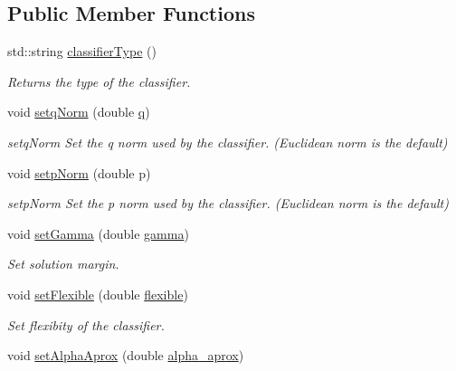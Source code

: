 \subsection*{Public Member Functions}
\begin{DoxyCompactItemize}
\item 
std\+::string \hyperlink{class_primal_classifier_af5117ae286ed7f06430b98f433e9bf62}{classifier\+Type} ()
\begin{DoxyCompactList}\small\item\em Returns the type of the classifier. \end{DoxyCompactList}\item 
void \hyperlink{class_primal_classifier_a22ca554e2a8d33d43c813b6b9b3e4a6a}{setq\+Norm} (double \hyperlink{class_primal_classifier_a746ad2ff93fb77d82ae389f90dbdc89e}{q})
\begin{DoxyCompactList}\small\item\em setq\+Norm Set the q norm used by the classifier. (Euclidean norm is the default) \end{DoxyCompactList}\item 
void \hyperlink{class_primal_classifier_a30cd3926ea5e7341920dcb5480567af1}{setp\+Norm} (double p)
\begin{DoxyCompactList}\small\item\em setp\+Norm Set the p norm used by the classifier. (Euclidean norm is the default) \end{DoxyCompactList}\item 
void \hyperlink{class_primal_classifier_a2d1443916a530c9b3729fb748097db50}{set\+Gamma} (double \hyperlink{class_primal_classifier_ab8c6099dda1468385b2c401cb65c1238}{gamma})
\begin{DoxyCompactList}\small\item\em Set solution margin. \end{DoxyCompactList}\item 
void \hyperlink{class_primal_classifier_acf3edea17de00a41c33d0fee4fabd4da}{set\+Flexible} (double \hyperlink{class_primal_classifier_af660bbc42f67792e3da8876671b1e9df}{flexible})
\begin{DoxyCompactList}\small\item\em Set flexibity of the classifier. \end{DoxyCompactList}\item 
void \hyperlink{class_primal_classifier_a49be3fca8d8383d98f9d671d1e1f27c7}{set\+Alpha\+Aprox} (double \hyperlink{class_primal_classifier_a1a432d06373100e176e116f995bdcd26}{alpha\+\_\+aprox})

\end{DoxyCompactItemize}

